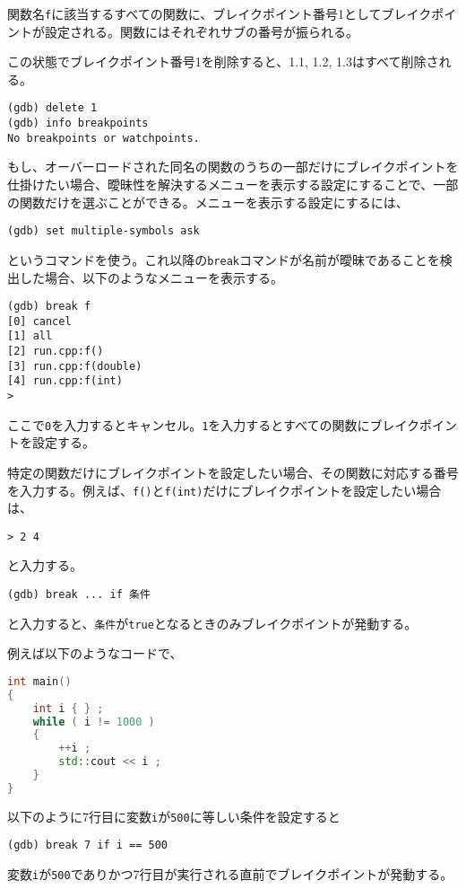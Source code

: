 関数名\texttt{f}に該当するすべての関数に、ブレイクポイント番号1としてブレイクポイントが設定される。関数にはそれぞれサブの番号が振られる。

この状態でブレイクポイント番号1を削除すると、1.1, 1.2, 1.3はすべて削除される。

\begin{lstlisting}[style=terminal]
(gdb) delete 1
(gdb) info breakpoints
No breakpoints or watchpoints.
\end{lstlisting}

もし、オーバーロードされた同名の関数のうちの一部だけにブレイクポイントを仕掛けたい場合、曖昧性を解決するメニューを表示する設定にすることで、一部の関数だけを選ぶことができる。メニューを表示する設定にするには、
\begin{lstlisting}[style=terminal]
(gdb) set multiple-symbols ask
\end{lstlisting}
というコマンドを使う。これ以降の\texttt{break}コマンドが名前が曖昧であることを検出した場合、以下のようなメニューを表示する。

\begin{lstlisting}[style=terminal]
(gdb) break f
[0] cancel
[1] all
[2] run.cpp:f()
[3] run.cpp:f(double)
[4] run.cpp:f(int)
>
\end{lstlisting}

ここで\texttt{0}を入力するとキャンセル。\texttt{1}を入力するとすべての関数にブレイクポイントを設定する。

特定の関数だけにブレイクポイントを設定したい場合、その関数に対応する番号を入力する。例えば、\texttt{f()}と\texttt{f(int)}だけにブレイクポイントを設定したい場合は、
\begin{lstlisting}[style=terminal]
> 2 4
\end{lstlisting}
と入力する。


\begin{lstlisting}[style=terminal]
(gdb) break ... if 条件
\end{lstlisting}
と入力すると、\texttt{条件}が\texttt{true}となるときのみブレイクポイントが発動する。

例えば以下のようなコードで、
\begin{lstlisting}[language={C++}]
int main()
{
    int i { } ;
    while ( i != 1000 )
    {
        ++i ;
        std::cout << i ;
    }
}
\end{lstlisting}
以下のように7行目に変数\texttt{i}が\texttt{500}に等しい条件を設定すると
\begin{lstlisting}[style=terminal]
(gdb) break 7 if i == 500
\end{lstlisting}
変数\texttt{i}が\texttt{500}でありかつ7行目が実行される直前でブレイクポイントが発動する。

